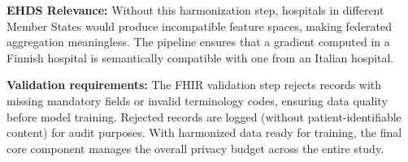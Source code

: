 \documentclass[conference,a4paper]{IEEEtran}
\begin{document}
\textbf{EHDS Relevance:} Without this harmonization step, hospitals in different Member States would produce incompatible feature spaces, making federated aggregation meaningless. The pipeline ensures that a gradient computed in a Finnish hospital is semantically compatible with one from an Italian hospital.

\begin{figure}[htbp]
\centering
{}
\end{figure}

\textbf{Validation requirements:} The FHIR validation step rejects records with missing mandatory fields or invalid terminology codes, ensuring data quality before model training. Rejected records are logged (without patient-identifiable content) for audit purposes. With harmonized data ready for training, the final core component manages the overall privacy budget across the entire study.
\end{document}

